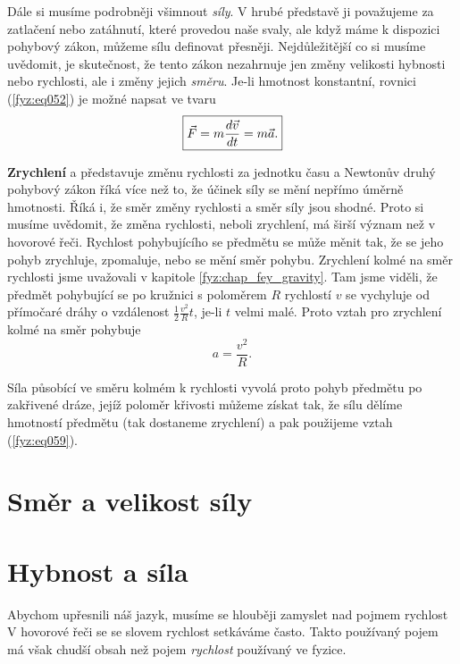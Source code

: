 {    Dále si musíme podrobněji všimnout \emph{síly}. V hrubé představě ji považujeme za zatlačení 
    nebo zatáhnutí, které provedou naše svaly, ale když máme k dispozici pohybový zákon, můžeme 
    sílu definovat přesněji. Nejdůležitější co si musíme uvědomit, je skutečnost, že tento zákon 
    nezahrnuje jen změny velikosti hybnosti nebo rychlosti, ale i změny jejich \emph{směru}. Je-li 
    hmotnost konstantní, rovnici (\ref{fyz:eq052}) je možné napsat ve tvaru
    \begin{equation}\label{fyz:eq053}
      \boxed{
        \vec{F} = m\frac{d \vec{v}}{d t} = m\vec{a}.
       }
    \end{equation}
    
    \textbf{Zrychlení} a představuje změnu rychlosti za jednotku času a Newtonův druhý pohybový 
    zákon říká více než to, že účinek síly se mění nepřímo úměrně hmotnosti. Říká i, že směr změny 
    rychlosti a směr síly jsou shodné. Proto si musíme uvědomit, že změna rychlosti, neboli 
    zrychlení, má širší význam než v hovorové řeči. Rychlost pohybujícího se předmětu se může měnit 
    tak, že se jeho pohyb zrychluje, zpomaluje, nebo se mění směr pohybu. Zrychlení kolmé na směr 
    rychlosti jsme uvažovali v kapitole \ref{fyz:chap_fey_gravity}. Tam jsme viděli, že předmět 
    pohybující se po kružnici s poloměrem \(R\) rychlostí \(v\) se vychyluje od přímočaré dráhy o 
    vzdálenost \(\frac{1}{2}\frac{v^2}{R}t\), je-li \(t\) velmi malé. Proto vztah pro zrychlení 
    kolmé na směr pohybuje
    \begin{equation}\label{fyz:eq059}
      a = \frac{v^2}{R}.
    \end{equation}
    
    Síla působící ve směru kolmém k rychlosti vyvolá proto pohyb předmětu po zakřivené dráze, jejíž 
    poloměr křivosti můžeme získat tak, že sílu dělíme hmotností předmětu (tak dostaneme zrychlení) 
    a pak použijeme vztah (\ref{fyz:eq059}).
    
  \section{Směr a velikost síly}\label{fyz:IchapIXsecI}
  \section{Hybnost a síla}\label{fyz:IchapIXsecII}
    Abychom upřesnili náš jazyk, musíme se hlouběji zamyslet nad pojmem rychlost V hovorové řeči se 
    se slovem rychlost setkáváme často. Takto používaný pojem má však chudší obsah než pojem 
    \emph{rychlost} používaný ve fyzice.

}
